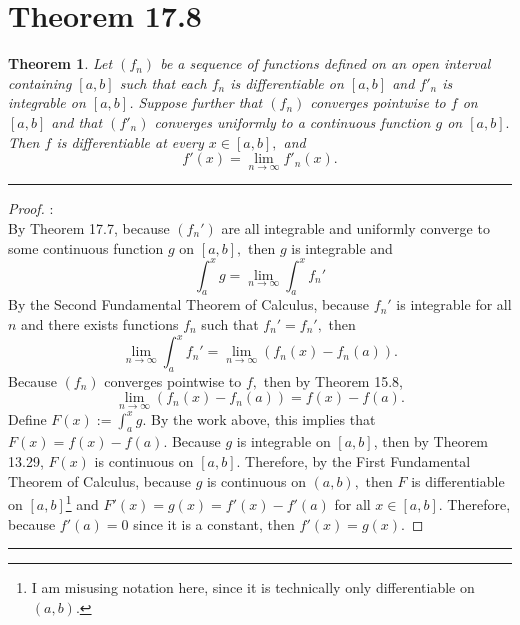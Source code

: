 \documentclass[openany, amssymb, psamsfonts]{amsart}
\newtheorem{thm}{Theorem}[section]
\theoremstyle{definition}
\numberwithin{equation}{section}
\begin{document}
\section*{Theorem 17.8}
\begin{thm}\label{17.8}
	Let $(f_n)$ be a sequence of functions defined on an open interval containing $[a, b]$ such that each $f_n$ is differentiable on $[a,b]$ and $f'_n$ is integrable on $[a, b]$. Suppose further that $(f_n)$ converges pointwise to $f$ on $[a,b]$ and that $(f'_n)$ converges uniformly to a continuous function $g$ on $[a,b].$ Then $f$ is differentiable at every $x\in [a,b],$ and
	\[
		f'(x) = \lim_{n \to \infty} f'_n(x).
	\]
\end{thm}
\vspace{4pt}     \hrule   \vspace{4pt}\begin{proof}:\\
By Theorem 17.7, because $(f_n')$ are all integrable and uniformly converge to some continuous function $g$ on $[a,b],$ then $g$ is integrable and \[\int_a^xg = \displaystyle\lim_{n\to \infty}\int_a^xf_n'\] By the Second Fundamental Theorem of Calculus, because $f_n'$ is integrable for all $n$ and there exists functions $f_n$ such that $f_n' = f_n',$ then \[\displaystyle\lim_{n\to \infty}\int_a^xf_n' = \lim_{n\to \infty}(f_n(x) - f_n(a)).\] Because $(f_n)$ converges pointwise to $f,$ then by Theorem 15.8, \[\displaystyle\lim_{n\to \infty}(f_n(x) - f_n(a)) = f(x) - f(a).\] Define $F(x) := \int_a^xg.$ By the work above, this implies that $F(x) = f(x) - f(a).$ Because $g$ is integrable on $[a,b]$, then by Theorem 13.29, $F(x)$ is continuous on $[a,b].$ Therefore, by the First Fundamental Theorem of Calculus, because $g$ is continuous on $(a,b),$ then $F$ is differentiable on $[a,b]$\footnote{I am misusing notation here, since it is technically only differentiable on $(a,b).$} and $F'(x) = g(x) = f'(x) - f'(a)$ for all $x\in [a,b].$ Therefore, because $f'(a) = 0$ since it is a constant, then $f'(x) = g(x).$
\end{proof}\vspace{4pt}     \hrule   \vspace{4pt}
\end{document}
